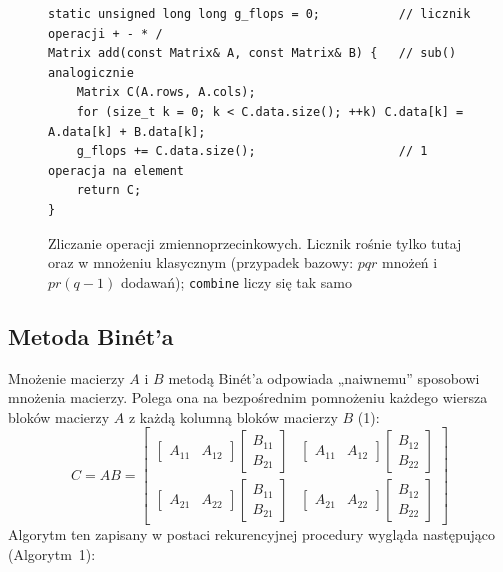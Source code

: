 \documentclass[11pt,a4paper]{article}
\begin{document}
\begin{figure}[H]
\centering
\begin{lstlisting}
static unsigned long long g_flops = 0;           // licznik operacji + - * /
Matrix add(const Matrix& A, const Matrix& B) {   // sub() analogicznie
    Matrix C(A.rows, A.cols);
    for (size_t k = 0; k < C.data.size(); ++k) C.data[k] = A.data[k] + B.data[k];
    g_flops += C.data.size();                    // 1 operacja na element
    return C;
}
\end{lstlisting}
\caption{Zliczanie operacji zmiennoprzecinkowych. Licznik rośnie tylko tutaj oraz w mnożeniu klasycznym
(przypadek bazowy: $pqr$ mnożeń i $pr(q{-}1)$ dodawań); \texttt{combine} liczy się tak samo}
\end{figure}

\subsection{Metoda Binét'a}
Mnożenie macierzy $A$ i $B$ metodą Binét'a odpowiada „naiwnemu'' sposobowi mnożenia macierzy. Polega ona na
bezpośrednim pomnożeniu każdego wiersza bloków macierzy $A$ z każdą kolumną bloków macierzy $B$ (1):
\begin{equation}
C = AB =
\begin{bmatrix}
\begin{bmatrix}A_{11} & A_{12}\end{bmatrix}\begin{bmatrix}B_{11}\\B_{21}\end{bmatrix} &
\begin{bmatrix}A_{11} & A_{12}\end{bmatrix}\begin{bmatrix}B_{12}\\B_{22}\end{bmatrix}\\[1ex]
\begin{bmatrix}A_{21} & A_{22}\end{bmatrix}\begin{bmatrix}B_{11}\\B_{21}\end{bmatrix} &
\begin{bmatrix}A_{21} & A_{22}\end{bmatrix}\begin{bmatrix}B_{12}\\B_{22}\end{bmatrix}
\end{bmatrix}
\end{equation}
Algorytm ten zapisany w postaci rekurencyjnej procedury wygląda następująco (Algorytm~1):
\end{document}
